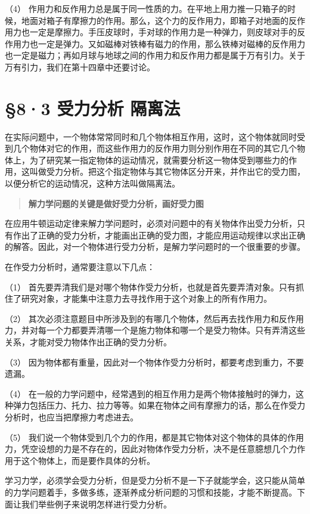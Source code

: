（4）
作用力和反作用力总是属于同一性质的力。在平地上用力推一只箱子的时候，地面对箱子有摩擦力的作用。那么，这个力的反作用力，即箱子对地面的反作用力也一定是摩擦力。手压皮球时，手对球的作用力是一种弹力，则皮球对手的反作用力也一定是弹力。又如磁棒对铁棒有磁力的作用，那么铁棒对磁棒的反作用力也一定是磁力；再如月球与地球之间的作用力和反作用力都是属于万有引力。关于万有引力，我们在第十四章中还要讨论。

\section{§8·3 受力分析
隔离法}\label{ux53d7ux529bux5206ux6790-ux9694ux79bbux6cd5}

在实际问题中，一个物体常常同时和几个物体相互作用，这时，这个物体就同时受到几个物体对它的作用，而这些作用力的反作用力则分别作用在不同的其它几个物体上，为了研究某一指定物体的运动情况，就需要分析这一物体受到哪些力的作用，这叫做受力分析。把这个指定物体与其它物体区分开来，并作出它的受力图，以便分析它的运动情况，这种方法叫做隔离法。

\begin{quote}
\textbf{解力学问题的关键是做好受力分析，画好受力图}
\end{quote}

在应用牛顿运动定律来解力学问题时，必须对问题中的有关物体作出受力分析，只有作出了正确的受力分析，才能画出正确的受力图，才能应用运动规律以求出正确的解答。因此，对一个物体进行受力分析，是解力学问题时的一个很重要的步骤。

在作受力分析时，通常要注意以下几点：

（1）
首先要弄清我们是对哪个物体作受力分析，也就是首先要弄清对象。只有抓住了研究对象，才能集中注意力去寻找作用于这个对象上的所有作用力。

（2）
其次必须注意题目中所涉及到的有哪几个物体，然后再去找作用力和反作用力，并对每一个力都要弄清哪一个是施力物体和哪一个是受力物体。只有弄清这些关系，才能对受力物体作出正确的受力分析。

（3）
因为物体都有重量，因此对一个物体作受力分析时，都要考虑到重力，不要遗漏。

（4）
在一般的力学问题中，经常遇到的相互作用力是两个物体接触时的弹力，这种弹力包括压力、托力、拉力等等。如果在物体之间有摩擦力的话，那么在作受力分析时，也应当把摩擦力考虑进去。

（5）
我们说一个物体受到几个力的作用，都是其它物体对这个物体的具体的作用力，凭空设想的力是不存在的，因此对物体作受力分析，决不是任意臆想几个力作用于这个物体上，而是要作具体的分析。

学习力学，必须学会受力分析，但是受力分析不是一下子就能学会，这只能从简单的力学问题着手，多做多练，逐渐养成分析问题的习惯和技能，才能不断提高。下面让我们举些例子来说明怎样进行受力分析。

